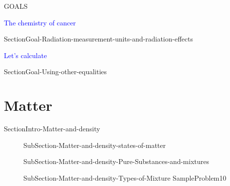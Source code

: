 \documentclass[main.tex]{subfiles}
\newcommand\chapterlabel{ChMIX-statesofmatter}\setcounter{figurenewcounter}{0}\setcounter{tablenewcounter}{0}\setcounter{formulanewcounter}{0}
\begin{document}
\begin{marginfigure}
\begin{mytcbox}{GOALS}
 
\renewcommand\chapterlabel{Ch-nuclear}
\begin{center}\textcolor{blue}{\faFlash The chemistry of cancer} \end{center}
\begin{enumerate}[label=\protect\circled{\color{white}\arabic*}]
{SectionGoal-Radiation-measurement-units-and-radiation-effects}
	\end{enumerate}

 
	\renewcommand\chapterlabel{Ch-measurements}
\begin{center}\textcolor{blue}{\faGears Let's calculate} \end{center}
\begin{enumerate}[label=\protect\circled{\color{white}\arabic*}]
{SectionGoal-Using-other-equalities}
\end{enumerate}



 \end{mytcbox}
 \end{marginfigure}%

\renewcommand\chapterlabel{Ch-measurements}
\section{\faEnvira  Matter}
{SectionIntro-Matter-and-density}
\sloppy\begin{description}
\item[] {SubSection-Matter-and-density-states-of-matter}
\item[]{SubSection-Matter-and-density-Pure-Substances-and-mixtures}
\item[]{SubSection-Matter-and-density-Types-of-Mixture}
{SampleProblem10}
\hspace{0cm}{Figure-Matter}		

\end{description}
\end{document}
